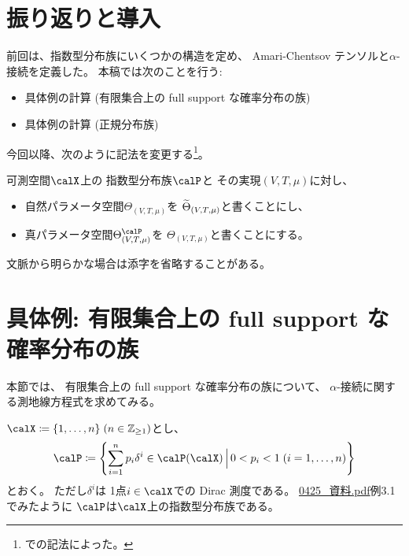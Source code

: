 \documentclass[report]{jlreq}
\begin{document}
%

%
\section*{振り返りと導入}

前回は、指数型分布族にいくつかの構造を定め、
Amari-Chentsov テンソルと$\alpha$-接続を定義した。
本稿では次のことを行う:

\begin{itemize}
    \item 具体例の計算 (有限集合上の full support な確率分布の族)
    \item 具体例の計算 (正規分布族)
\end{itemize}

今回以降、次のように記法を変更する\footnote{
    \cite{BN78}での記法によった。
}。

\begin{definition}[パラメータの空間の記法の変更]
    可測空間$\calX$上の
    指数型分布族$\calP$と
    その実現$(V, T, \mu)$に対し、
    \begin{itemize}
        \item 自然パラメータ空間$\Theta_{(V, T, \mu)}$を
            $\widetilde{\Theta}_{(V, T, \mu)}$と書くことにし、
        \item 真パラメータ空間$\Theta_{(V, T, \mu)}^\calP$を
            $\Theta_{(V, T, \mu)}$と書くことにする。
    \end{itemize}
    文脈から明らかな場合は添字を省略することがある。
\end{definition}

%
\section{具体例: 有限集合上の full support な確率分布の族}

本節では、
有限集合上の full support な確率分布の族について、
$\alpha$-接続に関する測地線方程式を求めてみる。

\begin{settings}
    $\calX \coloneqq \{ 1, \dots, n \} \; (n \in \Z_{\ge 1})$とし、
    \begin{equation}
        \calP \coloneqq \mybrace{
            \sum_{i = 1}^n p_i \delta^i
            \in \calP(\calX)
            \, \Big| \,
            0 < p_i < 1 \; (i = 1, \dots, n)
        }
    \end{equation}
    とおく。
    ただし$\delta^i$は
    1点$i \in \calX$での Dirac 測度である。
    \url{0425_資料.pdf}例3.1でみたように
    $\calP$は$\calX$上の指数型分布族である。
\end{settings}
\end{document}
